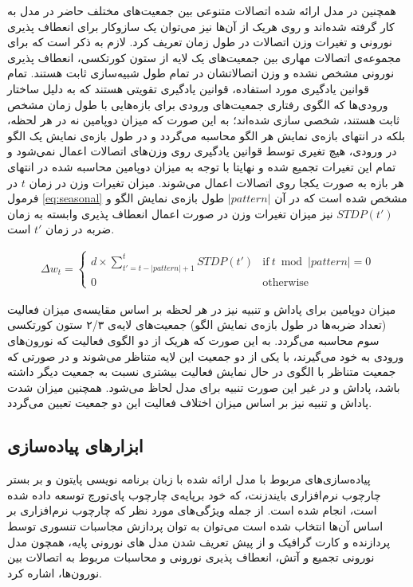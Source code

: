 \documentclass[12pt]{report}
\begin{document}
	همچنین در مدل ارائه شده اتصالات متنوعی بین جمعیت‌های مختلف حاضر در مدل به کار گرفته شده‌اند و روی هریک از آن‌ها نیز می‌توان یک سازوکار برای انعطاف پذیری نورونی و تغیرات وزن اتصالات در طول زمان تعریف کرد. لازم به ذکر است که برای مجموعه‌ی اتصالات مهاری بین جمعیت‌های یک لایه از ستون کورتکسی، انعطاف پذیری نورونی مشخص نشده و وزن اتصالاتشان در تمام طول شبیه‌سازی ثابت هستند. تمام قوانین یادگیری مورد استفاده، قوانین یادگیری تقویتی هستند که به دلیل ساختار ورودی‌ها که الگوی رفتاری جمعیت‌های ورودی برای بازه‌هایی با طول زمان مشخص ثابت هستند، شخصی سازی شده‌اند؛ به این صورت که میزان دوپامین نه در هر لحظه، بلکه در انتهای بازه‌ی نمایش هر الگو محاسبه می‌گردد و در طول بازه‌ی نمایش یک الگو در ورودی، هیچ تغیری توسط قوانین یادگیری روی وزن‌های اتصالات اعمال نمی‌شود و تمام این تغیرات تجمیع شده و نهایتا با توجه به میزان دوپامین محاسبه شده در انتهای هر بازه به صورت یکجا روی اتصالات اعمال می‌شوند. میزان تغیرات وزن در زمان $t$ در فرمول \ref{eq:seasonal} مشخص شده است که در آن $|pattern|$ طول بازه‌ی نمایش الگو و $STDP(t')$ نیز میزان تغیرات وزن در صورت اعمال انعطاف پذیری وابسته به زمان ضربه در زمان $t'$ است.
	
	\begin{align}
		\Delta w_t =
		\begin{cases}
			d \times \sum_{t'=t-\left | pattern \right |+1}^{t} STDP(t') & \text{if}~t\bmod\left | pattern \right | = 0\\
			0 & \text{otherwise}
		\end{cases}  
		\label{eq:seasonal}
	\end{align}
	
	میزان دوپامین برای پاداش و تنبیه نیز در هر لحظه بر اساس مقایسه‌ی میزان فعالیت (تعداد ضربه‌ها در طول بازه‌ی نمایش الگو) جمعیت‌های لایه‌ی ۲/۳ ستون کورتکسی سوم محاسبه می‌گردد. به این صورت که هریک از دو الگوی فعالیت که نورون‌های ورودی به خود می‌گیرند، با یکی از دو جمعیت این لایه متناظر می‌شوند و در صورتی که جمعیت متناظر با الگوی در حال نمایش فعالیت بیشتری نسبت به جمعیت دیگر داشته باشد، پاداش و در غیر این صورت تنبیه برای مدل لحاظ می‌شود. همچنین میزان شدت پاداش و تنبیه نیز بر اساس میزان اختلاف فعالیت این دو جمعیت تعیین می‌گردد.
	
	

	\subsection{ابزار‌های پیاده‌سازی}
	
	پیاده‌سازی‌های مربوط با مدل ارائه شده با زبان برنامه نویسی پایتون و بر بستر چارچوب نرم‌افزاری بایندزنت، که خود برپایه‌ی چارچوب پای‌تورچ توسعه داده شده است، انجام شده است. از جمله ویژگی‌های مورد نظر که چارچوب نرم‌افزاری بر اساس آن‌ها انتخاب شده است می‌توان به توان پردازش مجاسبات تنسوری توسط پردازنده و کارت گرافیک و از پیش تعریف شدن مدل های نورونی پایه، همچون مدل نورونی تجمیع و آتش، انعطاف پذیری نورونی و محاسبات مربوط به اتصالات بین نورون‌ها، اشاره کرد.
	
\end{document}

